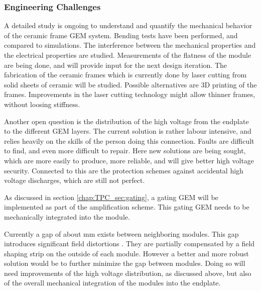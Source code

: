 \subsubsection{Engineering Challenges}
A detailed study is ongoing to understand and quantify the mechanical behavior of the ceramic frame GEM system. Bending tests have been performed, and compared to simulations. The interference between the mechanical properties and the electrical properties are studied. Measurements of the flatness of the module are being done, and will provide input for the next design iteration.
The fabrication of the ceramic frames which is currently done by laser cutting from solid sheets of ceramic will be studied. Possible alternatives are 3D printing of the frames. Improvements in the laser cutting technology might allow thinner frames, without loosing stiffness.

Another open question is the distribution of the high voltage from the endplate to the different GEM layers. The current solution is rather labour intensive, and relies heavily on the skills of the person doing this connection. Faults are difficult to find, and even more difficult to repair. Here new solutions are being sought, which are more easily to produce, more reliable, and will give better high voltage security. Connected to this are the protection schemes against accidental high voltage discharges, which are still not perfect.

As discussed in section \ref{chap:TPC_sec:gating}, a gating GEM will be implemented as part of the amplification scheme. This gating GEM needs to be mechanically integrated into the module.

Currently a gap of about \unit[2]{mm} exists between neighboring modules. This gap introduces significant field distortions \cite{Zenker:2014qra}. They are partially compensated by a field shaping strip on the outside of each module. However a better and more robust solution would be to further minimize the gap between modules. Doing so will need improvements of the high voltage distribution, as discussed above, but also of the overall mechanical integration of the modules into the endplate.

